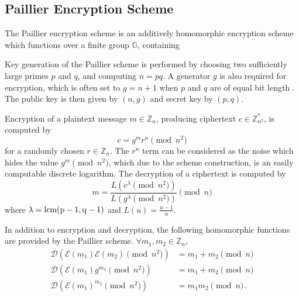 \documentclass[twocolumn]{autart}    %
\begin{document}

\subsection{Paillier Encryption Scheme}
The Paillier encryption scheme is an additively homomorphic encryption scheme which functions over a finite group $\mathbb{G}$, containing 


Key generation of the Paillier scheme is performed by choosing two sufficiently large primes $p$ and $q$, and computing $n=pq$. A generator $g$ is also required for encryption, which is often set to $g=n+1$ when $p$ and $q$ are of equal bit length \cite{}. The public key is then given by $(n, g)$ and secret key by $(p, q)$.

Encryption of a plaintext message $m \in \mathbb{Z}_n$, producing ciphertext $c \in \mathbb{Z}^{*}_{n^2}$, is computed by
\begin{equation}
    c = g^m r^n \pmod{n^2}
\end{equation}
for a randomly chosen $r \in \mathbb{Z}_{n}$. The $r^n$ term can be considered as the noise which hides the value $g^m \pmod{n^2}$, which due to the scheme construction, is an easily computable discrete logarithm. The decryption of a ciphertext is computed by
\begin{equation}
    m = \frac{L(c^\lambda\pmod{n^2})}{L(g^\lambda\pmod{n^2})} \pmod{n}
\end{equation}
where $\lambda = \operatorfont{lcm}(p-1, q-1)$ and $L(u) = \frac{u-1}{n}$.

In addition to encryption and decryption, the following homomorphic functions are provided by the Paillier scheme. $\forall m_1,m_2 \in \mathbb{Z}_n$,
\begin{align}
    \mathcal{D}(\mathcal{E}(m_1)\mathcal{E}(m_2)\!\pmod{n^2}) &= m_1+m_2\!\pmod{n} \\
    \mathcal{D}(\mathcal{E}(m_1)g^{m_2}\!\pmod{n^2}) &= m_1+m_2\!\pmod{n} \\
    \mathcal{D}(\mathcal{E}(m_1)^{m_2}\!\pmod{n^2}) &= m_1m_2\!\pmod{n}\,.
\end{align}
\end{document}
